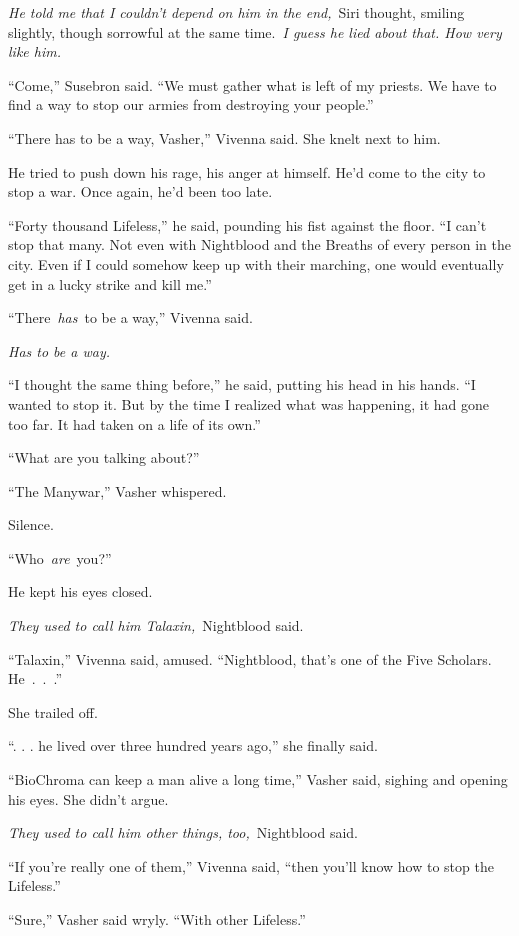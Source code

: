 \textit{He told me that I couldn’t depend on him in the end,}~Siri thought, smiling slightly, though sorrowful at the same time.~\textit{I guess he lied about that. How very like him.}

“Come,” Susebron said. “We must gather what is left of my priests. We have to find a way to stop our armies from destroying your people.”

\orn

“There has to be a way, Vasher,” Vivenna said. She knelt next to him.

He tried to push down his rage, his anger at himself. He’d come to the city to stop a war. Once again, he’d been too late.

“Forty thousand Lifeless,” he said, pounding his fist against the floor. “I can’t stop that many. Not even with Nightblood and the Breaths of every person in the city. Even if I could somehow keep up with their marching, one would eventually get in a lucky strike and kill me.”

“There~\textit{has}~to be a way,” Vivenna said.

\textit{Has to be a way.}

“I thought the same thing before,” he said, putting his head in his hands. “I wanted to stop it. But by the time I realized what was happening, it had gone too far. It had taken on a life of its own.”

“What are you talking about?”

“The Manywar,” Vasher whispered.

Silence.

“Who~\textit{are}~you?”

He kept his eyes closed.

\textit{They used to call him Talaxin,}~Nightblood said.

“Talaxin,” Vivenna said, amused. “Nightblood, that’s one of the Five Scholars. He~.~.~.”

She trailed off.

“. . . he lived over three hundred years ago,” she finally said.

“BioChroma can keep a man alive a long time,” Vasher said, sighing and opening his eyes. She didn’t argue.

\textit{They used to call him other things, too,}~Nightblood said.

“If you’re really one of them,” Vivenna said, “then you’ll know how to stop the Lifeless.”

“Sure,” Vasher said wryly. “With other Lifeless.”

